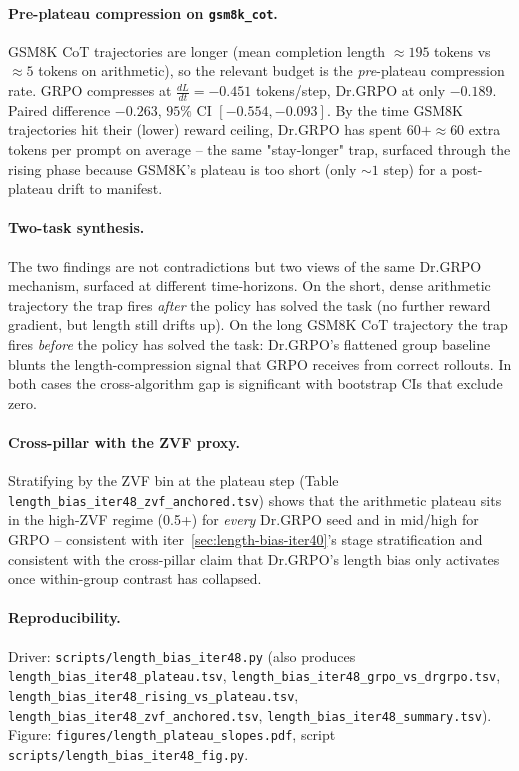 \paragraph{Pre-plateau compression on \texttt{gsm8k\_cot}.}
GSM8K CoT trajectories are longer (mean completion length $\approx 195$ tokens
vs $\approx 5$ tokens on arithmetic), so the relevant budget is the
\emph{pre}-plateau compression rate. GRPO compresses at $\tfrac{dL}{dt} = -0.451$
tokens/step, Dr.GRPO at only $-0.189$. Paired difference $-0.263$, $95\%$ CI
$[-0.554, -0.093]$. By the time GSM8K trajectories hit their (lower) reward
ceiling, Dr.GRPO has spent $60{+} \approx 60$ extra tokens per prompt on
average -- the same "stay-longer" trap, surfaced through the rising phase
because GSM8K's plateau is too short (only $\sim 1$ step) for a
post-plateau drift to manifest.

\paragraph{Two-task synthesis.}
The two findings are not contradictions but two views of the same Dr.GRPO
mechanism, surfaced at different time-horizons. On the short, dense
arithmetic trajectory the trap fires \emph{after} the policy has solved the
task (no further reward gradient, but length still drifts up). On the long
GSM8K CoT trajectory the trap fires \emph{before} the policy has solved the
task: Dr.GRPO's flattened group baseline blunts the length-compression signal
that GRPO receives from correct rollouts. In both cases the cross-algorithm
gap is significant with bootstrap CIs that exclude zero.

\paragraph{Cross-pillar with the ZVF proxy.}
Stratifying by the ZVF bin at the plateau step (Table
\texttt{length\_bias\_iter48\_zvf\_anchored.tsv}) shows that the arithmetic
plateau sits in the high-ZVF regime (0.5+) for \emph{every} Dr.GRPO seed and
in mid/high for GRPO -- consistent with iter~\ref{sec:length-bias-iter40}'s stage
stratification and consistent with the cross-pillar claim that Dr.GRPO's
length bias only activates once within-group contrast has collapsed.

\paragraph{Reproducibility.}
Driver: \texttt{scripts/length\_bias\_iter48.py} (also produces
\texttt{length\_bias\_iter48\_plateau.tsv},
\texttt{length\_bias\_iter48\_grpo\_vs\_drgrpo.tsv},
\texttt{length\_bias\_iter48\_rising\_vs\_plateau.tsv},
\texttt{length\_bias\_iter48\_zvf\_anchored.tsv},
\texttt{length\_bias\_iter48\_summary.tsv}).
Figure: \texttt{figures/length\_plateau\_slopes.pdf},
script \texttt{scripts/length\_bias\_iter48\_fig.py}.

